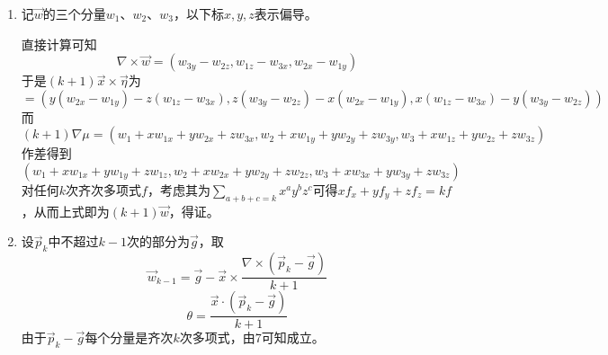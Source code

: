 \documentclass[a4paper,UTF8,fontset=windows,10pt]{ctexart}
\begin{document}
\begin{enumerate}
    \item
    记$\vec{w}$的三个分量$w_1$、$w_2$、$w_3$，以下标$x,y,z$表示偏导。

    直接计算可知
    $$\nabla\times\vec{w}=(w_{3y}-w_{2z},w_{1z}-w_{3x},w_{2x}-w_{1y})$$
    于是$(k+1)\vec{x}\times\vec{\eta}$为
    $$=(y(w_{2x}-w_{1y})-z(w_{1z}-w_{3x}),z(w_{3y}-w_{2z})-x(w_{2x}-w_{1y}),x(w_{1z}-w_{3x})-y(w_{3y}-w_{2z}))$$
    而
    $$(k+1)\nabla\mu=(w_1+xw_{1x}+yw_{2x}+zw_{3x},w_2+xw_{1y}+yw_{2y}+zw_{3y},w_3+xw_{1z}+yw_{2z}+zw_{3z})$$
    作差得到
    $$(w_1+xw_{1x}+yw_{1y}+zw_{1z},w_2+xw_{2x}+yw_{2y}+zw_{2z},w_3+xw_{3x}+yw_{3y}+zw_{3z})$$
    对任何$k$次齐次多项式$f$，考虑其为$\sum_{a+b+c=k}x^ay^bz^c$可得$xf_x+yf_y+zf_z=kf$，从而上式即为$(k+1)\vec{w}$，得证。

    \item
    设$\vec{p}_k$中不超过$k-1$次的部分为$\vec{g}$，取
    $$\vec{w}_{k-1}=\vec{g}-\vec{x}\times\frac{\nabla\times(\vec{p}_k-\vec{g})}{k+1}$$
    $$\theta=\frac{\vec{x}\cdot(\vec{p}_k-\vec{g})}{k+1}$$
    由于$\vec{p}_k-\vec{g}$每个分量是齐次$k$次多项式，由7可知成立。
\end{enumerate}
\end{document}
